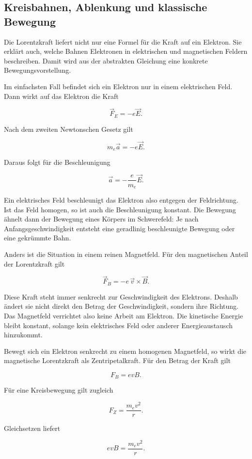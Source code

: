 \subsection{Kreisbahnen, Ablenkung und klassische Bewegung}
\label{sec:kreisbahnen-ablenkung-klassische-bewegung}

Die Lorentzkraft liefert nicht nur eine Formel für die Kraft auf ein Elektron.
Sie erklärt auch, welche Bahnen Elektronen in elektrischen und magnetischen
Feldern beschreiben. Damit wird aus der abstrakten Gleichung eine konkrete
Bewegungsvorstellung.

Im einfachsten Fall befindet sich ein Elektron nur in einem elektrischen Feld.
Dann wirkt auf das Elektron die Kraft

\[
\vec{F}_E = -e\vec{E}.
\]

Nach dem zweiten Newtonschen Gesetz gilt

\[
m_e\vec{a} = -e\vec{E}.
\]

Daraus folgt für die Beschleunigung

\[
\vec{a} = -\frac{e}{m_e}\vec{E}.
\]

Ein elektrisches Feld beschleunigt das Elektron also entgegen der Feldrichtung.
Ist das Feld homogen, so ist auch die Beschleunigung konstant. Die Bewegung
ähnelt dann der Bewegung eines Körpers im Schwerefeld: Je nach Anfangsgeschwindigkeit
entsteht eine geradlinig beschleunigte Bewegung oder eine gekrümmte Bahn.

Anders ist die Situation in einem reinen Magnetfeld. Für den magnetischen
Anteil der Lorentzkraft gilt

\[
\vec{F}_B = -e\,\vec{v} \times \vec{B}.
\]

Diese Kraft steht immer senkrecht zur Geschwindigkeit des Elektrons. Deshalb
ändert sie nicht direkt den Betrag der Geschwindigkeit, sondern ihre Richtung.
Das Magnetfeld verrichtet also keine Arbeit am Elektron. Die kinetische Energie
bleibt konstant, solange kein elektrisches Feld oder anderer Energieaustausch
hinzukommt.

Bewegt sich ein Elektron senkrecht zu einem homogenen Magnetfeld, so wirkt die
magnetische Lorentzkraft als Zentripetalkraft. Für den Betrag der Kraft gilt

\[
F_B = e v B.
\]

Für eine Kreisbewegung gilt zugleich

\[
F_Z = \frac{m_e v^2}{r}.
\]

Gleichsetzen liefert

\[
e v B = \frac{m_e v^2}{r}.
\]

